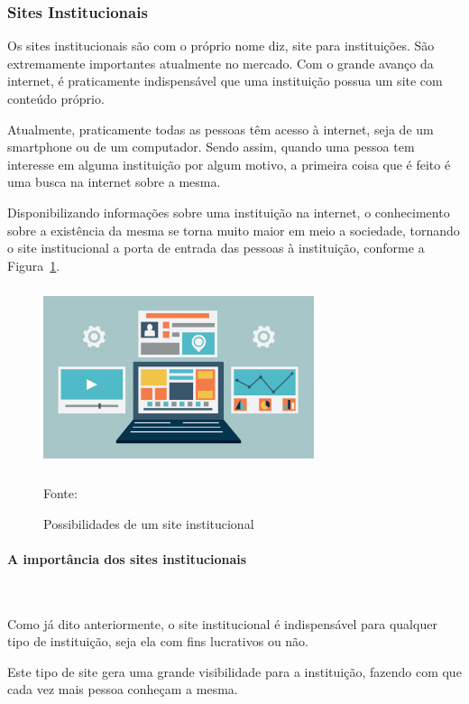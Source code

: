 \subsubsection{Sites Institucionais}
Os sites institucionais são com o próprio nome diz, site para instituições. São extremamente importantes atualmente no mercado. Com o grande avanço da internet, é praticamente indispensável que uma instituição possua um site com conteúdo próprio.

Atualmente, praticamente todas as pessoas têm acesso à internet, seja de um smartphone ou de um computador. Sendo assim, quando uma pessoa tem interesse em alguma instituição por algum motivo, a primeira coisa que é feito é uma busca na internet sobre a mesma.

\newpage
Disponibilizando informações sobre uma instituição na internet, o conhecimento sobre a existência da mesma se torna muito maior em meio a sociedade, tornando o site institucional a porta de entrada das pessoas à instituição, conforme a Figura~\hypersetup{linkcolor=black}\ref{fig:Possibilidades}.


 \begin{figure}[!h]
	\centering
	\caption{Possibilidades de um site institucional }
	\label{fig:Possibilidades}
	\includegraphics[width=300px, height=200px]{./images/2-4.jpg}
	\par{Fonte: \cite{markeninja}}
\end{figure}

\paragraph{A importância dos sites institucionais}\mbox{}\\
\par

Como já dito anteriormente, o site institucional é indispensável para qualquer tipo de instituição, seja ela com fins lucrativos ou não.

Este tipo de site gera uma grande visibilidade para a instituição, fazendo com que cada vez mais pessoa conheçam a mesma.

